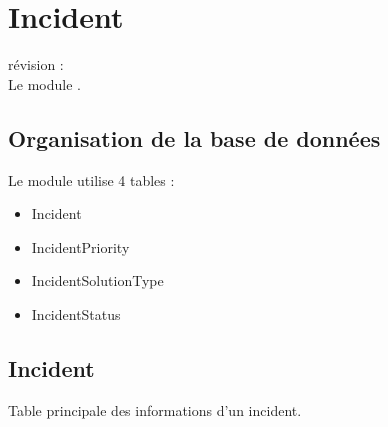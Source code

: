 

\clearpage
\section{Incident}

révision :  \\
Le module \incident \obm.\\

\subsection{Organisation de la base de données}

Le module \incident utilise 4 tables :
\begin{itemize}
 \item Incident
 \item IncidentPriority
 \item IncidentSolutionType
 \item IncidentStatus
\end{itemize}


\subsection{Incident}

Table principale des informations d'un incident.\\

